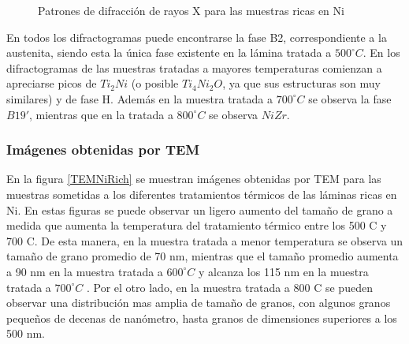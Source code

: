 \documentclass[12pt]{article}
\theoremstyle{definition}
\theoremstyle{remark}
\begin{document}
{\begin{figure}[H]
\caption{Patrones de difracción de rayos X para las muestras ricas en Ni}
\label{RXNiRich}
\end{figure}

En todos los difractogramas puede encontrarse la fase B2, correspondiente a la austenita, siendo esta la única fase existente en la lámina tratada a $500 ^\circ C$. En los difractogramas de las muestras tratadas a mayores temperaturas comienzan a apreciarse picos de $Ti_2Ni$ (o posible $Ti_4Ni_2O$, ya que sus estructuras son muy similares) y de fase H. Además en la muestra tratada a $700 ^\circ C$ se observa la fase $B19'$, mientras que en la tratada a $800 ^\circ C$ se observa $NiZr$.

\subsubsection{Imágenes obtenidas por TEM}

En la figura \ref{TEMNiRich} se muestran imágenes obtenidas por TEM para las muestras sometidas a los diferentes tratamientos térmicos de las láminas ricas en Ni. En estas figuras se puede observar un ligero aumento del tamaño de grano a medida que aumenta la temperatura del tratamiento térmico entre los 500 \textdegree C y 700 \textdegree C. De esta manera, en la muestra tratada a menor temperatura se observa un tamaño de grano promedio de 70 nm, mientras que el tamaño promedio aumenta a 90 nm en la muestra tratada a $600 ^\circ C$ y alcanza los 115 nm en la muestra tratada a $700 ^\circ C$ . Por el otro lado, en la muestra tratada a 800 \textdegree C se pueden observar una distribución mas amplia de tamaño de granos, con algunos granos pequeños de decenas de nanómetro, hasta granos de dimensiones superiores a los 500 nm. 

}
\end{document}
